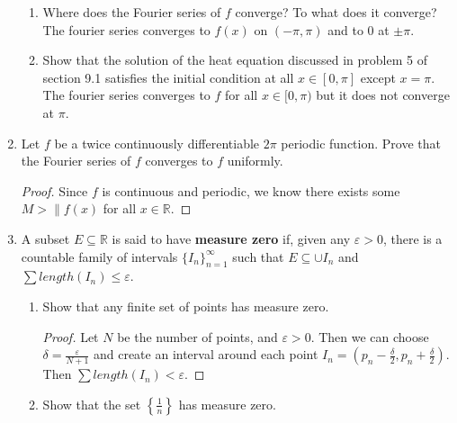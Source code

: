 \documentclass{article}
\begin{document}
\begin{enumerate}
\begin{enumerate}
                  \item Where does the Fourier series of $f$ converge? To what does
                        it converge?
                        \medbreak
                        The fourier series converges to $f(x)$ on $(-\pi, \pi)$ and
                        to $0$ at $\pm\pi$.
                  \item Show that the solution of the heat equation discussed in
                        problem 5 of section 9.1 satisfies the initial condition
                        at all $x\in[0,\pi]$ except $x=\pi$.
                        \medbreak
                        The fourier series converges to $f$ for all $x\in[0, \pi)$
                        but it does not converge at $\pi$.
            \end{enumerate}
            \setcounter{enumi}{6}
      \item Let $f$ be a twice continuously differentiable $2\pi$ periodic
            function. Prove that the Fourier series of $f$ converges to $f$
            uniformly.
            \begin{proof}
                  Since $f$ is continuous and periodic, we know there exists some $M>\lVert f(x)$ for all $x\in\mathbb{R}$.
            \end{proof}
            \setcounter{enumi}{9}
      \item A subset $E\subseteq \mathbb{R}$ is said to have \textbf{measure zero}
            if, given any $\varepsilon>0$, there is a countable family of intervals
            $\{I_n\}_{n=1}^\infty$ such that $E\subseteq\cup I_n$ and
            $\sum length(I_n)\leq \varepsilon$.
            \begin{enumerate}
                  \item Show that any finite set of points has measure zero.
                        \begin{proof}
                              Let $N$ be the number of points, and $\varepsilon>0$.
                              Then we can choose $\delta=\frac{\varepsilon}{N+1}$
                              and create an interval around each point
                              $I_n=(p_n-\frac{\delta}{2}, p_n+\frac{\delta}{2})$.
                              Then $\sum length(I_n)<\varepsilon$.
                        \end{proof}
                  \item Show that the set $\left\{\frac{1}{n}\right\}$ has measure zero.

\end{enumerate}
\end{enumerate}
\end{document}

